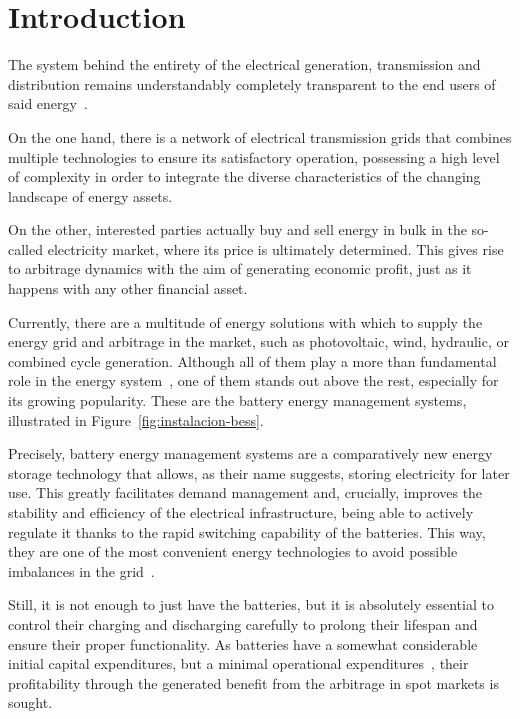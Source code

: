\cleardoublepage

\chapter{Introduction}
\label{makereference9}

The system behind the entirety of the electrical generation, transmission and distribution remains understandably completely transparent to the end users of said energy~\cite{garrues2009red}.

On the one hand, there is a network of electrical transmission grids that combines multiple technologies to ensure its satisfactory operation, possessing a high level of complexity in order to integrate the diverse characteristics of the changing landscape of energy assets.

On the other, interested parties actually buy and sell energy in bulk in the so-called electricity market, where its price is ultimately determined. This gives rise to arbitrage dynamics with the aim of generating economic profit, just as it happens with any other financial asset.

Currently, there are a multitude of energy solutions with which to supply the energy grid and arbitrage in the market, such as photovoltaic, wind, hydraulic, or combined cycle generation. Although all of them play a more than fundamental role in the energy system~\cite{turkenburg2000renewable}, one of them stands out above the rest, especially for its growing popularity. These are the battery energy management systems, illustrated in Figure~\ref{fig:instalacion-bess}.

Precisely, battery energy management systems are a comparatively new energy storage technology that allows, as their name suggests, storing electricity for later use. This greatly facilitates demand management and, crucially, improves the stability and efficiency of the electrical infrastructure, being able to actively regulate it thanks to the rapid switching capability of the batteries. This way, they are one of the most convenient energy technologies to avoid possible imbalances in the grid~\cite{xu2014bess}.

Still, it is not enough to just have the batteries, but it is absolutely essential to control their charging and discharging carefully to prolong their lifespan and ensure their proper functionality. As batteries have a somewhat considerable initial capital expenditures, but a minimal operational expenditures~\cite{larsson2018cost}, their profitability through the generated benefit from the arbitrage in spot markets is sought.

